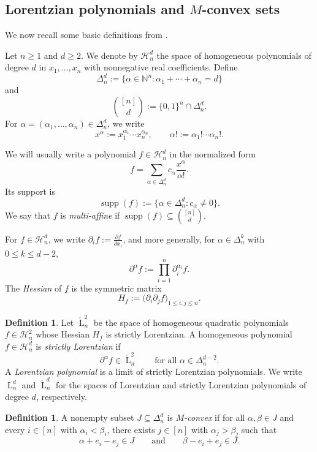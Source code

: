 \documentclass[12pt]{amsart}
\theoremstyle{definition}
\newtheorem{definition}[theorem]{Definition}
\newcommand{\1}{\mathbf{1}}
\DeclareMathOperator{\upL}{L}   %
\DeclareMathOperator{\supp}{supp}
\newcommand\N{{\mathbb N}}
\newcommand{\Hd}{\mathcal{H}^{d}}
\newcommand{\Htwo}{\mathcal{H}^{2}}
\begin{document}
\subsection{Lorentzian polynomials and $M$-convex sets}

We now recall some basic definitions from \cite{Branden-Huh20}.

Let $n\ge 1$ and $d\ge 2$. We denote by $\Hd_n$ the space of homogeneous polynomials
of degree $d$ in $x_1,\dots,x_n$ with nonnegative real coefficients.
Define
\[
\Delta_n^d := \bigl\{\alpha\in \N^n : \alpha_1+\cdots+\alpha_n = d\bigr\}
\]
and
\[
\binom{[n]}{d} := \{0,1\}^n \cap \Delta_n^d.
\]
For $\alpha=(\alpha_1,\dots,\alpha_n)\in \Delta_n^d$, we write
\[
x^\alpha := x_1^{\alpha_1}\cdots x_n^{\alpha_n},
\qquad
\alpha! := \alpha_1!\cdots \alpha_n!.
\]

We will usually write a polynomial $f\in \Hd_n$ in the normalized form
\[
f=\sum_{\alpha\in \Delta_n^d} c_\alpha \frac{x^\alpha}{\alpha!}.
\]
Its support is
\[
\supp(f):=\{\alpha\in \Delta_n^d : c_\alpha\neq 0\}.
\]
We say that $f$ is \emph{multi-affine} if $\supp(f)\subseteq \binom{[n]}{d}$.

For $f\in \Hd_n$, we write $\partial_i f:=\frac{\partial f}{\partial x_i}$, and more
generally, for $\alpha\in \Delta_n^k$ with $0\le k\le d-2$,
\[
\partial^\alpha f := \prod_{i=1}^n \partial_i^{\alpha_i} f.
\]
The \emph{Hessian} of $f$ is the symmetric matrix
\[
H_f := \bigl(\partial_i \partial_j f\bigr)_{1\le i,j\le n}.
\]

\begin{definition}
Let $\mathring{\upL}_n^2$ be the space of homogeneous quadratic polynomials
$f\in \Htwo_n$ whose Hessian $H_f$ is strictly Lorentzian.
A homogeneous polynomial $f\in \Hd_n$ is \emph{strictly Lorentzian} if
\[
\partial^\alpha f \in \mathring{\upL}_n^2
\qquad\text{for all }\alpha\in \Delta_n^{d-2}.
\]
A \emph{Lorentzian polynomial} is a limit of strictly Lorentzian polynomials.
We write $\upL_n^d$ and $\mathring{\upL}_n^d$ for the spaces of Lorentzian and strictly
Lorentzian polynomials of degree $d$, respectively.
\end{definition}

\begin{definition}
A nonempty subset $J\subseteq \Delta_n^d$ is \emph{$M$-convex} if for all
$\alpha,\beta\in J$ and every $i\in [n]$ with $\alpha_i<\beta_i$, there exists
$j\in [n]$ with $\alpha_j>\beta_j$ such that
\[
\alpha+e_i-e_j \in J
\qquad\text{and}\qquad
\beta-e_i+e_j \in J.
\]
\end{definition}
\end{document}
